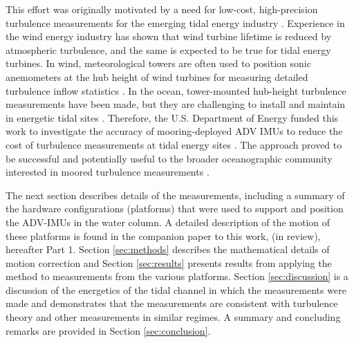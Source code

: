 This effort was originally motivated by a need for low-cost, high-precision turbulence measurements for the emerging tidal energy industry \cite[]{Mccaffrey++2015, Alexander+Hamlington2015}. Experience in the wind energy industry has shown that wind turbine lifetime is reduced by atmospheric turbulence, and the same is expected to be true for tidal energy turbines. In wind, meteorological towers are often used to position sonic anemometers at the hub height of wind turbines for measuring detailed turbulence inflow statistics \cite[]{Hand++2003, Kelley++2005, Mucke++2011, Afgan++2013}. In the ocean, tower-mounted hub-height turbulence measurements have been made, but they are challenging to install and maintain in energetic tidal sites \cite[]{Gunawan++2014,Thomson++2012}. Therefore, the U.S. Department of Energy funded this work to investigate the accuracy of mooring-deployed ADV IMUs to reduce the cost of turbulence measurements at tidal energy sites \cite[]{Kilcher++2016}. The approach proved to be successful and potentially useful to the broader oceanographic community interested in moored turbulence measurements \cite[]{Lueck+Huang1999, Doherty++1999, Nash++2004, Moum+Nash2009b, Alford2010, Paskyabi+Fer2013}.

The next section describes details of the measurements, including a summary of the hardware configurations (platforms) that were used to support and position the ADV-IMUs in the water column. A detailed description of the motion of these platforms is found in the companion paper to this work, \citeauthor{Harding++2017} (in review), hereafter Part 1. Section \ref{sec:methods} describes the mathematical details of motion correction and Section \ref{sec:results} presents results from applying the method to measurements from the various platforms. Section \ref{sec:discussion} is a discussion of the energetics of the tidal channel in which the measurements were made and demonstrates that the measurements are consistent with turbulence theory and other measurements in similar regimes. A summary and concluding remarks are provided in Section \ref{sec:conclusion}.


